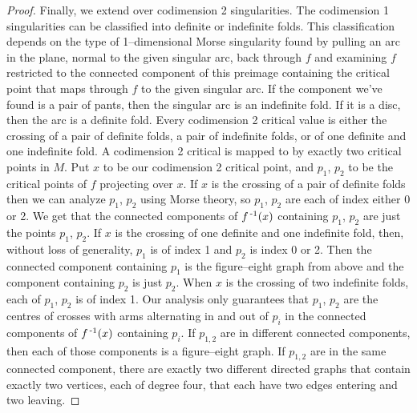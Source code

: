 \begin{proof}
Finally, we extend over codimension 2 singularities.
The codimension 1 singularities can be classified into definite or indefinite folds.
This classification depends on the type of 1--dimensional Morse singularity found by pulling an arc in the plane, normal to the given singular arc, back through $f$ and examining $f$ restricted to the connected component of this preimage containing the critical point that maps through $f$ to the given singular arc.
If the component we've found is a pair of pants, then the singular arc is an indefinite fold.
If it is a disc, then the arc is a definite fold.
Every codimension 2 critical value is either the crossing of a pair of definite folds, a pair of indefinite folds, or of one definite and one indefinite fold.
A codimension 2 critical is mapped to by exactly two critical points in $M$.
Put $x$ to be our codimension 2 critical point, and $p_1$, $p_2$ to be the critical points of $f$ projecting over $x$.
If $x$ is the crossing of a pair of definite folds then we can analyze $p_1$, $p_2$ using Morse theory, so $p_1$, $p_2$ are each of index either 0 or 2.
We get that the connected components of $f^{\,\text{-}1} (x)$ containing $p_1$, $p_2$ are just the points $p_1$, $p_2$.
If $x$ is the crossing of one definite and one indefinite fold, then, without loss of generality, $p_1$ is of index 1 and $p_2$ is index 0 or 2.
Then the connected component containing $p_1$ is the figure--eight graph from above and the component containing $p_2$ is just $p_2$.
When $x$ is the crossing of two indefinite folds, each of $p_1$, $p_2$ is of index 1.
Our analysis only guarantees that $p_1$, $p_2$ are the centres of crosses with arms alternating in and out of $p_i$ in the connected components of $f^{\,\text{-}1}(x)$ containing $p_i$.
If $p_{1,2}$ are in different connected components, then each of those components is a figure--eight graph.
If $p_{1,2}$ are in the same connected component, there are exactly two different directed graphs that contain exactly two vertices, each of degree four, that each have two edges entering and two leaving.


\end{proof}
